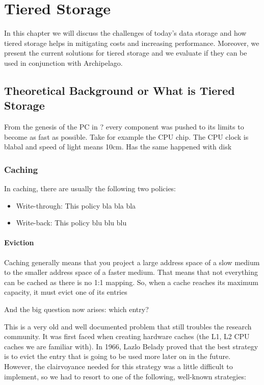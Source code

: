 \chapter{Tiered Storage}\label{ch:tiering}

In this chapter we will discuss the challenges of today's data storage and how 
tiered storage helps in mitigating costs and increasing performance. Moreover, 
we present the current solutions for tiered storage and we evaluate if they can 
be used in conjunction with Archipelago.

\section{Theoretical Background or What is Tiered Storage}

From the genesis of the PC in ? every component was pushed to its limits to 
become as fast as possible. Take for example the CPU chip. The CPU clock is 
blabal and speed of light means 10cm. Has the same happened with disk

\subsection{Caching}

In caching, there are usually the following two policies:

\begin{itemize}
	\item Write-through:
		This policy bla bla bla
	\item Write-back:
		This policy blu blu blu
\end{itemize}

\subsubsection{Eviction}

Caching generally means that you project a large address space of a slow medium 
to the smaller address space of a faster medium. That means that not everything 
can be cached as there is no 1:1 mapping. So, when a cache reaches its maximum 
capacity, it must evict one of its entries

And the big question now arises: which entry?

This is a very old and well documented problem that still troubles the research 
community. It was first faced when creating hardware caches (the L1, L2 CPU 
caches we are familiar with). In 1966, Lazlo Belady proved that the best 
strategy is to evict the entry that is going to be used more later on in the 
future\cite{Belady}.  However, the clairvoyance needed for this strategy was a 
little difficult to implement, so we had to resort to one of the following, 
well-known strategies:

